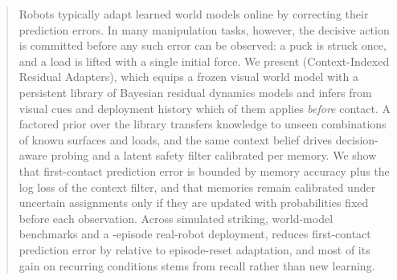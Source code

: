 \begin{abstract}
Robots typically adapt learned world models online by correcting their prediction errors. In many manipulation tasks, however, the decisive action is committed before any such error can be observed: a puck is struck once, and a load is lifted with a single initial force. We present \method (Context-Indexed Residual Adapters), which equips a frozen visual world model with a persistent library of Bayesian residual dynamics models and infers from visual cues and deployment history which of them applies \emph{before} contact. A factored prior over the library transfers knowledge to unseen combinations of known surfaces and loads, and the same context belief drives decision-aware probing and a latent safety filter calibrated per memory. We show that first-contact prediction error is bounded by memory accuracy plus the log loss of the context filter, and that memories remain calibrated under uncertain assignments only if they are updated with probabilities fixed before each observation. Across simulated striking, world-model benchmarks and a -episode real-robot deployment, \method reduces first-contact prediction error by  relative to episode-reset adaptation, and most of its gain on recurring conditions stems from recall rather than new learning.
\end{abstract}
